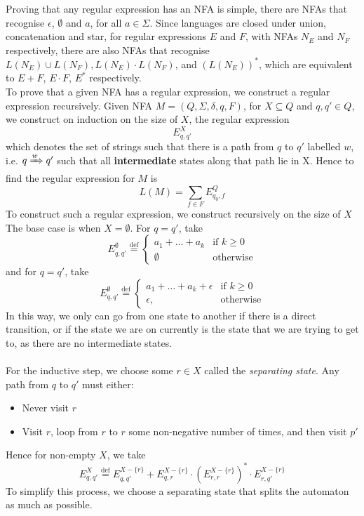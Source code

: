\documentclass{article}
\newcommand{\dTrans}[3]{ #1 \xRightarrow{ #2 }\mathrel{\vphantom{\to}} #3 }
\newcommand{\eqdef}[0]{ \overset{\text{def}}{=} }
\begin{document}
    Proving that any regular expression has an NFA is simple, there are NFAs that recognise $\epsilon$, $\emptyset$ and $a$, for all $a \in \Sigma$. Since languages are closed under union, concatenation and star, for regular expressions $E$ and $F$, with NFAs $N_E$ and $N_F$ respectively, there are also NFAs that recognise $L(N_E) \cup L(N_F), L(N_E) \cdot L(N_F)$, and $(L(N_E))^*$, which are equivalent to $E + F$, $E \cdot F$, $E^*$ respectively. \\  

    To prove that a given NFA has a regular expression, we construct a regular expression recursively. Given NFA $M = (Q, \Sigma, \delta, q, F)$, for $X \subseteq Q$ and $q, q' \in Q$, we construct on induction on the size of $X$, the regular expression
    \[ E^X_{q,q'} \]
    which denotes the set of strings such that there is a path from $q$ to $q'$ labelled $w$, i.e. $\dTrans{q}{w}{q'}$ such that all \textbf{intermediate} states along that path lie in X. Hence to find the regular expression for $M$ is
    \[ L(M) = \sum_{f \in F} E^Q_{q_0,f}\]
    To construct such a regular expression, we construct recursively on the size of $X$ The base case is when $X = \emptyset$. For $q = q'$, take
    \[ E^\emptyset_{q,q'} \eqdef 
        \begin{cases}
    			a_1 + \ldots + a_k & \text{if $k \geq 0$}\\
                \emptyset & \text{otherwise}
        \end{cases}\]
    and for $q=q'$, take
    \[ E^\emptyset_{q,q'} \eqdef 
        \begin{cases}
    			a_1 + \ldots + a_k + \epsilon & \text{if $k \geq 0$}\\
                \epsilon, & \text{otherwise}
        \end{cases}\]
        In this way, we only can go from one state to another if there is a direct transition, or if the state we are on currently is the state that we are trying to get to, as there are no intermediate states. \\ \\
        For the inductive step, we choose some $r \in X$ called the \textit{separating state}. Any path from $q$ to $q'$ must either:
        \begin{itemize}
            \item Never visit $r$
            \item Visit $r$, loop from $r$ to $r$ some non-negative number of times, and then visit $p'$
        \end{itemize}
        Hence for non-empty $X$, we take
        \[ E^X_{q,q'} \eqdef E^{X - \{r\}}_{q,q'} + E^{X - \{r\}}_{q,r} \cdot (E^{X - \{r\}}_{r,r})^* \cdot E^{X - \{r\}}_{r,q'} \]
        To simplify this process, we choose a separating state that splits the automaton as much as possible. 
\end{document}
